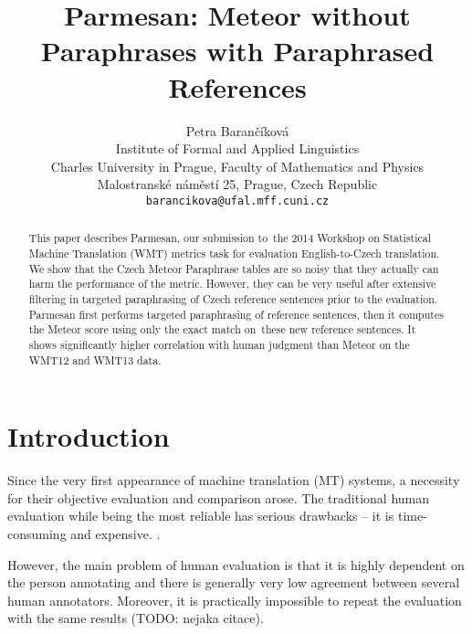 \documentclass[11pt]{article}
\title{Parmesan: Meteor without Paraphrases with Paraphrased References}
\author{Petra Barančíková \\
  Institute of Formal and Applied Linguistics \\
  Charles University in Prague, Faculty of Mathematics and Physics\\
  Malostranské náměstí 25, Prague, Czech Republic \\
  {\tt barancikova@ufal.mff.cuni.cz} \\}
\date{}
\begin{document}
\maketitle
\begin{abstract}
This paper describes Parmesan, our submission to~the 2014 Workshop on Statistical
Machine Translation (WMT) metrics task for evaluation English-to-Czech translation. 
We show that the Czech Meteor Paraphrase tables are so noisy that they actually can harm 
the performance of the metric. However, they can be very useful after extensive filtering 
in targeted paraphrasing of Czech reference sentences prior to the evaluation.
Parmesan first performs targeted paraphrasing of reference sentences, then it computes 
the Meteor score using only the exact match on~these new reference sentences. It shows 
significantly higher correlation with human judgment than Meteor on the WMT12 and WMT13 data. 
\end{abstract}

\section{Introduction}
Since the very first appearance of machine translation (MT) systems, a necessity
for their objective evaluation and comparison arose. The traditional human evaluation 
while being the most reliable has serious drawbacks -- it is time-consuming and expensive.
.%

However, the main problem of human evaluation is that it is highly dependent on the 
person annotating and there is generally very low agreement between several human
annotators. %
Moreover, it is practically impossible to repeat the evaluation with the same
results (TODO: nejaka citace).
\end{document}
